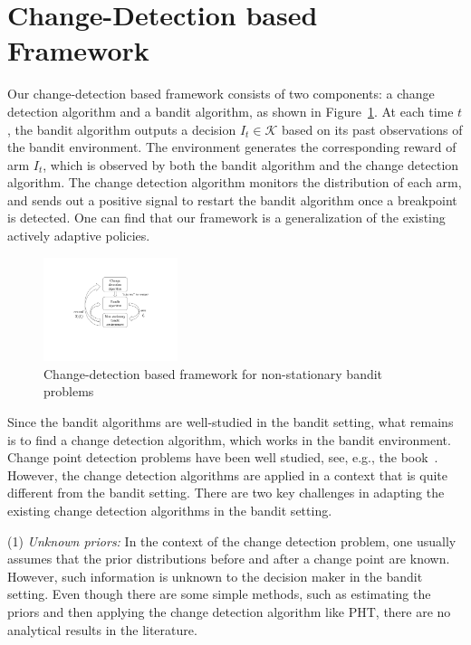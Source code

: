 \documentclass[letterpaper]{article}
\newcommand{\blue}{}
\begin{document}
\section{Change-Detection based Framework}\label{sec:framework}
Our change-detection based framework consists of two components: a change detection algorithm and a bandit algorithm, as shown in Figure~\ref{fig:framework}. At each time $t$, the bandit algorithm outputs a decision $I_t\in\mathcal{K}$ based on its past observations of the bandit environment. The environment generates the corresponding reward of arm $I_t$, which is observed by both the bandit algorithm and the change detection algorithm. The change detection algorithm monitors the distribution of each arm, and sends out a positive signal to restart the bandit algorithm once a breakpoint is detected. One can find that our framework is a generalization of the existing actively adaptive policies.
\begin{figure}
  \centering
    \includegraphics[width=0.35\textwidth]{Slide1} %
     \caption{Change-detection based framework for non-stationary bandit problems}
     \label{fig:framework}
\end{figure}


Since the bandit algorithms are well-studied in the bandit setting, what remains is to find a change detection algorithm, which works in the bandit environment. Change point detection problems have been well studied, see, e.g., the book~\cite{basseville1993detection}. However, the change detection algorithms are applied in a context that is quite different from the bandit setting. There are two key challenges in adapting the existing change detection algorithms in the bandit setting.

(1) \emph{Unknown priors:} In the context of the change detection
problem, one usually assumes that the prior distributions before and
after a change point are known. However, such information is unknown
to the decision maker in the bandit setting. Even though there are
some simple methods, such as estimating the priors and then applying
the change detection algorithm {\blue like PHT}, there are no analytical results in the
literature.
\end{document}
